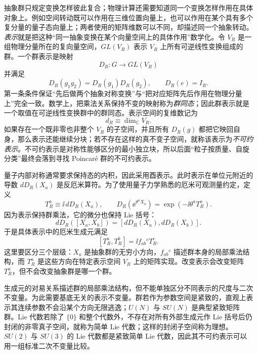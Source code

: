 抽象群只规定变换怎样彼此复合；物理计算还需要知道同一个变换怎样作用在具体对象上。例如空间转动既可以作用在三维位置向量上，也可以作用在某个具有多个复分量的量子态向量上；两者使用的矩阵维数可以不同，却描述同一个抽象转动。\emph{表示}就是把这种“同一抽象变换在某个向量空间上的具体作用”数学化。令 $V_R$ 是一组物理分量所在的复向量空间，$GL(V_R)$ 表示 $V_R$ 上所有可逆线性变换组成的群。一个群表示是映射
\begin{equation*}
 D_R:G\longrightarrow GL(V_R)
\end{equation*}
并满足
\begin{equation*}
 D_R(g_1g_2)=D_R(g_1)D_R(g_2),
 \qquad D_R(e)=I_R.
\end{equation*}
第一条条件保证“先后做两个抽象对称变换”与“把对应矩阵先后作用在物理分量上”完全一致。数学上，把乘法关系保持不变的映射称为\emph{群同态}；因此群表示就是一个取值在可逆线性变换群中的群同态。表示空间的复维数记为
\begin{equation*}
 d_R\equiv\dim_{\mathbb C}V_R.
\end{equation*}
如果存在一个既非零也非整个 $V_R$ 的子空间，并且所有 $D_R(g)$ 都把它映回自身，那么表示还能继续分块；若不存在这样的真不变子空间，就称该表示为\emph{不可约表示}。不可约表示是对称性能够区分的最小独立块，所以后面“粒子按质量、自旋分类”最终会落到寻找 Poincar\'e 群的不可约表示。

量子内部对称通常要求保持态的内积，因此采用酉表示。此时表示在单位元附近的导数 $dD_R(X_a)$ 是反厄米算符。为了使用量子力学熟悉的厄米可观测量约定，定义
\begin{equation}
 {T_R^a\equiv \ii\,dD_R(X_a),}
 \qquad
 D_R(\ee^{\theta^aX_a})
 =\exp(-\ii\theta^aT_R^a).
 \label{eq:unitary-representation-generators-dp68}
\end{equation}
因为表示保持群乘法，它的微分也保持 Lie 括号：
\begin{equation*}
 dD_R([X_a,X_b])
 =[dD_R(X_a),dD_R(X_b)].
\end{equation*}
于是具体表示中的厄米生成元满足
\begin{equation}
 {[T_R^a,T_R^b]=\ii f_{ab}{}^{c}T_R^c.}
 \label{eq:rep-lie-algebra-dp11}
\end{equation}
这里要区分三个层级：$X_a$ 是抽象群的无穷小方向，$f_{ab}{}^c$ 描述群本身的局部乘法结构，而 $T_R^a$ 是这些方向在特定表示空间 $V_R$ 上的矩阵实现。改变表示会改变矩阵 $T_R^a$，但不会改变抽象群是哪一个群。



生成元的对易关系描述群的局部乘法结构，但不能单独区分不同表示的尺度与二次不变量。为此需要基底无关的表示不变量。群若作为参数空间是紧致的，直观上表示其连续参数不会沿某个方向无限逃逸；$U(N)$ 与 $SU(N)$ 是典型紧致矩阵群。Lie 代数若除了 $\{0\}$ 和整个代数外，不存在对所有外部生成元作 Lie 括号后仍封闭的非零真子空间，就称为简单 Lie 代数；这样的封闭子空间称为理想。$SU(2)$ 与 $SU(3)$ 的 Lie 代数都是紧致简单 Lie 代数，因此其不可约表示可以用一组标准二次不变量比较。

